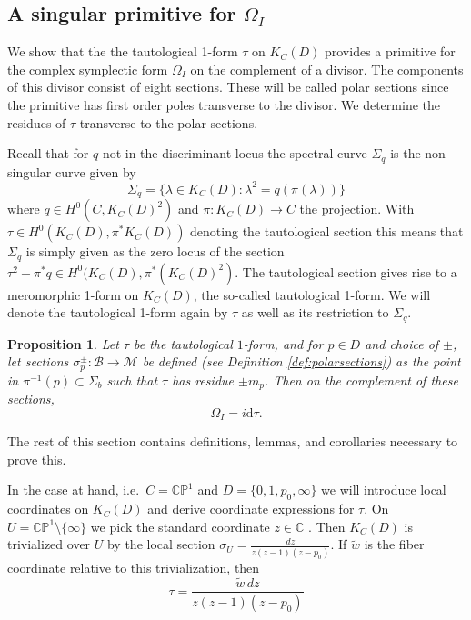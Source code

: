 \documentclass[12pt,letterpaper,reqno]{amsart}
\newtheorem{prop}[thm]{Proposition}
\theoremstyle{remark}
\theoremstyle{definition}
\numberwithin{thm}{section}
\numberwithin{equation}{section}
\numberwithin{figure}{section}
\newcommand{\C}{\ensuremath{\mathbb C}}
\newcommand{\CP}{\ensuremath{\mathbb {CP}}}
\newcommand{\de}{\mathrm{d}}
\begin{document}
\subsection{A singular primitive for \texorpdfstring{$\Omega_I$}{the holomorphic symplectic form}} 
We show that the the tautological 1-form $\tau$ on $K_C(D)$ provides a primitive for the complex symplectic form $\Omega_I$ on  the complement of a divisor. The components of this divisor consist of eight sections. These will be called polar sections since the primitive has first order poles transverse to the divisor. We determine the residues of $\tau$ transverse to the polar sections.


Recall that for $q$ not in the discriminant locus the spectral curve $\Sigma_q$ is the non-singular curve given by
\[
\Sigma_q = \{ \lambda \in K_C(D) : \lambda^2 = q(\pi(\lambda))\} 
\]
where $q \in H^0(C, K_C(D)^2)$ and $\pi : K_C(D) \to C$ the projection. With $\tau \in H^0(K_C(D), \pi^* K_C(D))$ denoting the tautological section this means that $\Sigma_q$ is simply given as the zero locus of the section $\tau^2 - \pi^* q \in H^0(K_C(D), \pi^* (K_C(D)^2)$. The tautological section gives rise to a meromorphic 1-form on $K_C(D)$, the so-called tautological 1-form. We will denote the tautological 1-form again by $\tau$ as well as its restriction to $\Sigma_q$.

\begin{prop}\label{prop:primitive}
Let $\tau$ be the tautological $1$-form, and for $p \in D$ and choice of $\pm$, let sections $\sigma_p^{\pm}: \mathcal{B} \to \mathcal{M}$ be defined (see Definition \ref{def:polarsections}) as the point in $\pi^{-1}(p) \subset \Sigma_b$ such that $\tau$ has residue $\pm m_p$. Then on the complement of these sections, 
\[ \Omega_I = i \de \tau. \]
\end{prop}
The rest of this section contains definitions, lemmas, and corollaries necessary to prove this.

In the case at hand, i.e.\ $C = \CP^1$ and $D=\{0,1,p_0,\infty\}$ we will introduce local coordinates on $K_C(D)$ and derive coordinate expressions for $\tau$. On $U =\CP^1\setminus \{\infty\}$ we pick the standard coordinate $z \in \C$ . Then $K_C(D)$ is trivialized over $U$ by the local section $\sigma_U=\frac{dz}{z(z-1)(z-p_0)}$. If $\tilde w$ is the fiber coordinate relative to this trivialization, then
\[
\tau = \frac{\tilde{w} \, dz}{z(z-1)(z-p_0)}
\]
\end{document}
